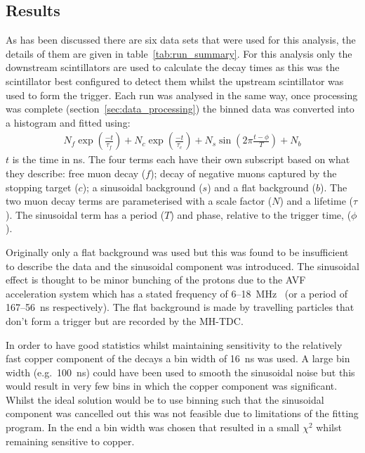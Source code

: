 \subsection{Results} %
\label{sec:momenta_results}
As has been discussed there are six data sets that were used for this analysis, the details of them are given in table~\ref{tab:run_summary}. For this analysis only the downstream scintillators are used to calculate the decay times as this was the scintillator best configured to detect them whilst the upstream scintillator was used to form the trigger. Each run was analysed in the same way, once processing was complete (section~\ref{sec:data_processing}) the binned data was converted into a histogram and fitted using:
\begin{align}
  N_{f}\exp\left(\frac{-t}{\tau_{f}}\right) + N_{c}\exp\left(\frac{-t}{\tau_{c}}\right) + N_{s}\sin\left(2\pi\frac{t-\phi}{T}\right) + N_{b} \label{equ:fit}
\end{align}
\(t\) is the time in ns. The four terms each have their own subscript based on what they describe: free muon decay (\(f\)); decay of negative muons captured by the stopping target (\(c\)); a sinusoidal background (\(s\)) and a flat background (\(b\)). The two muon decay terms are parameterised with a scale factor (\(N\)) and a lifetime (\(\tau\)). The sinusoidal term has a period (\(T\)) and phase, relative to the trigger time, (\(\phi\)). 

Originally only a flat background was used but this was found to be insufficient to describe the data and the sinusoidal component was introduced. The sinusoidal effect is thought to be minor bunching of the protons due to the AVF acceleration system which has a stated frequency of 6--18~MHz~\cite{avf_facility} (or a period of 167--56~ns respectively). The flat background is made by travelling particles that don't form a trigger but are recorded by the MH-TDC.

In order to have good statistics whilst maintaining sensitivity to the relatively fast copper component of the decays a bin width of 16~ns was used. A large bin width (e.g.\ 100~ns) could have been used to smooth the sinusoidal noise but this would result in very few bins in which the copper component was significant. Whilst the ideal solution would be to use binning such that the sinusoidal component was cancelled out this was not feasible due to limitations of the fitting program. In the end a bin width was chosen that resulted in a small \(\chi^2\) whilst remaining sensitive to copper.

